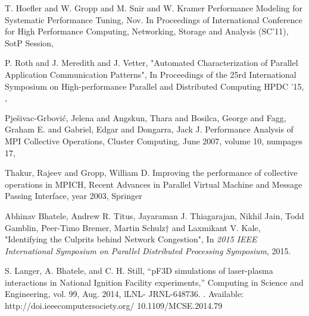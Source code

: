 \documentclass[conference]{IEEEtran}
\begin{document}
\begin{thebibliography}{10}
T. Hoefler and W. Gropp and M. Snir and W. Kramer
\newblock Performance Modeling for Systematic Performance Tuning,
\newblock Nov.
\newblock In {Proceedings of International Conference for High Performance Computing, Networking, Storage and Analysis (SC'11), SotP Session,
}

P. Roth and J. Meredith and J. Vetter,
\newblock "Automated Characterization of Parallel Application Communication Patterns",
In Proceedings of the 25rd International Symposium on High-performance Parallel and Distributed Computing
\newblock HPDC '15,
,


Pje\v{s}ivac-Grbovi\'{c}, Jelena and Angskun, Thara and Bosilca, George and Fagg, Graham E. and Gabriel, Edgar and Dongarra, Jack J.
\newblock Performance Analysis of MPI Collective Operations,
\newblock Cluster Computing,
\newblock June 2007,
\newblock volume 10,
\newblock numpages 17,
 

Thakur, Rajeev and Gropp, William D.
\newblock Improving the performance of collective operations in MPICH,
\newblock Recent Advances in Parallel Virtual Machine and Message Passing Interface,
\newblock year 2003,
\newblock Springer

Abhinav Bhatele, Andrew R. Titus, Jayaraman J. Thiagarajan, Nikhil Jain, Todd Gamblin,
Peer-Timo Bremer, Martin Schulz† and Laxmikant V. Kale,
\newblock "Identifying the Culprits behind Network Congestion",
\newblock In {\em 2015 IEEE International Symposium on Parallel Distributed Processing Symposium}, 2015.

S. Langer, A. Bhatele, and C. H. Still,
\newblock “pF3D simulations of laser-plasma interactions in National Ignition Facility experiments,” 
\newblock Computing in Science and Engineering, vol. 99, Aug. 2014, lLNL- JRNL-648736. 
\newblock [Online]. Available: http://doi.ieeecomputersociety.org/ 10.1109/MCSE.2014.79

%


\end{thebibliography}
\end{document}
